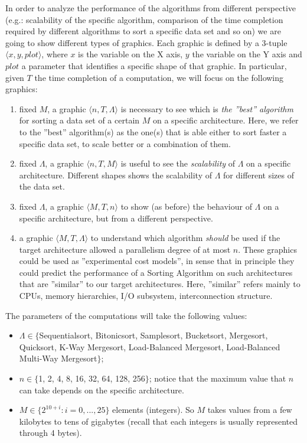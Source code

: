 In order to analyze the performance of the algorithms from different perspective (e.g.: scalability of the specific algorithm, comparison of the time completion required by different algorithms to sort a specific data set and so on) we are going to show different types of graphics. Each graphic is defined by a 3-tuple $\langle x, y, plot \rangle $, where $x$ is the variable on the X axis, $y$ the variable on the Y axis and $plot$ a parameter that identifies a specific shape of that graphic. In particular, given $T$ the time completion of a computation, we will focus on the following graphics:
\begin{enumerate}
\item fixed $M$, a graphic $\langle n, T, \Lambda \rangle $ is necessary to see which is \textit{the ''best'' algorithm} for sorting a data set of a certain $M$ on a specific architecture. Here, we refer to the ''best'' algorithm(s) as the one(s) that is able either to sort faster a specific data set, to scale better or a combination of them. 
\item fixed $\Lambda$, a graphic $\langle n, T, M \rangle$ is useful to see the \textit{scalability} of $\Lambda$ on a specific architecture. Different shapes shows the scalability of $\Lambda$ for different sizes of the data set.
\item fixed $\Lambda$, a graphic $\langle M, T, n \rangle$ to show (as before) the behaviour of $\Lambda$ on a specific architecture, but from a different perspective. 
\item a graphic $\langle M, T, \Lambda \rangle$ to understand which algorithm \textit{should} be used if the target architecture allowed a parallelism degree of at most $n$. These graphics could be used as ''experimental cost models'', in sense that in principle they could predict the performance of a Sorting Algorithm on such architectures that are ''similar'' to our target architectures. Here, ''similar'' refers mainly to CPUs, memory hierarchies, I/O subsystem, interconnection structure.  
\end{enumerate}

The parameters of the computations will take the following values:
\begin{itemize}
\item $\Lambda \in \lbrace$Sequentialsort, Bitonicsort, Samplesort, Bucketsort, Mergesort, Quicksort, K-Way Mergesort, Load-Balanced Mergesort, Load-Balanced Multi-Way Mergesort$\rbrace$;
\item $n \in \lbrace$1, 2, 4, 8, 16, 32, 64, 128, 256$\rbrace$; notice that the maximum value that $n$ can take depends on the specific architecture. 
\item $M \in \lbrace 2^{10 + i} : i = 0, ..., 25\rbrace$ elements (integers). So $M$ takes values from a few kilobytes to tens of gigabytes (recall that each integers is usually represented through 4 bytes).
\end{itemize} 

